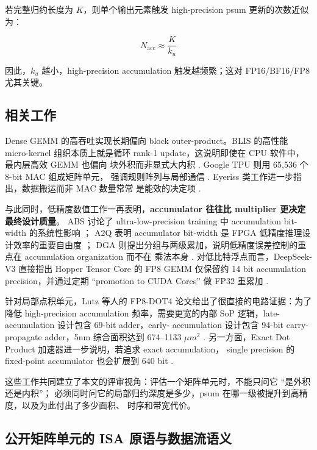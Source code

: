 \documentclass[UTF8,11pt,a4paper]{ctexart}
\newcommand{\ku}{\ensuremath{k_u}}
\begin{document}
若完整归约长度为 $K$，则单个输出元素触发 high-precision psum 更新的次数近似为：

\begin{equation}
N_{\text{acc}} \approx \frac{K}{\ku}
\end{equation}

因此，$\ku$ 越小，high-precision accumulation 触发越频繁；这对 FP16/BF16/FP8 尤其关键。

\subsection{相关工作}

Dense GEMM 的高吞吐实现长期偏向 block outer-product。BLIS 的高性能 micro-kernel
组织本质上就是循环 rank-1 update，这说明即使在 CPU 软件中，最内层高效 GEMM 也偏向
块外积而非显式大内积 \cite{blis}. Google TPU 则用 65,536 个 8-bit MAC 组成矩阵单元，
强调规则阵列与局部通信 \cite{tpu}. Eyeriss 类工作进一步指出，数据搬运而非 MAC 数量常常
是能效的决定项 \cite{eyeriss}.

与此同时，低精度数值工作一再表明，\textbf{accumulator 往往比 multiplier 更决定最终设计质量}。
ABS 讨论了 ultra-low-precision training 中 accumulation bit-width 的系统性影响 \cite{abs}；
A2Q 表明 accumulator bit-width 是 FPGA 低精度推理设计效率的重要自由度 \cite{a2q}；
DGA 则提出分组与两级累加，说明低精度误差控制的重点在 accumulation organization 而不在
乘法本身 \cite{dga}. 对低比特浮点而言，DeepSeek-V3 直接指出 Hopper Tensor Core 的 FP8 GEMM
仅保留约 14 bit accumulation precision，并通过定期 ``promotion to CUDA Cores'' 做 FP32
重累加 \cite{deepseekv3}.

针对局部点积单元，Lutz 等人的 FP8-DOT4 论文给出了很直接的电路证据：为了降低 high-precision
accumulation 频率，需要更宽的内部 SoP 逻辑，late-accumulation 设计包含 69-bit adder，early-
accumulation 设计包含 94-bit carry-propagate adder，5nm 综合面积达到 674--1133 $\mu m^2$
\cite{lutz2024}. 另一方面，Exact Dot Product 加速器进一步说明，若追求 exact accumulation，
single precision 的 fixed-point accumulator 也会扩展到 640 bit \cite{exactdot}.

这些工作共同建立了本文的评审视角：评估一个矩阵单元时，不能只问它 ``是外积还是内积''；
必须同时问它的局部归约深度是多少，psum 在哪一级被提升到高精度，以及为此付出了多少面积、
时序和带宽代价。

\subsection{公开矩阵单元的 ISA 原语与数据流语义}
\end{document}
